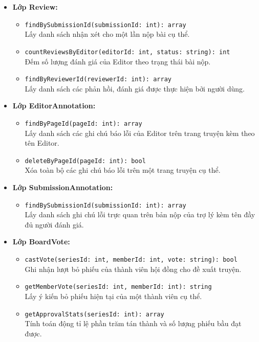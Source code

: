\begin{itemize}
    \item \textbf{Lớp Review:}
    \begin{itemize}
        \item \texttt{findBySubmissionId(submissionId: int): array}\\
            Lấy danh sách nhận xét cho một lần nộp bài cụ thể.
        \item \texttt{countReviewsByEditor(editorId: int, status: string): int}\\
            Đếm số lượng đánh giá của Editor theo trạng thái bài nộp.
        \item \texttt{findByReviewerId(reviewerId: int): array}\\
            Lấy danh sách các phản hồi, đánh giá được thực hiện bởi người dùng.
    \end{itemize}

    \item \textbf{Lớp EditorAnnotation:}
    \begin{itemize}
        \item \texttt{findByPageId(pageId: int): array}\\
            Lấy danh sách các ghi chú báo lỗi của Editor trên trang truyện kèm theo tên Editor.
        \item \texttt{deleteByPageId(pageId: int): bool}\\
            Xóa toàn bộ các ghi chú báo lỗi trên một trang truyện cụ thể.
    \end{itemize}

    \item \textbf{Lớp SubmissionAnnotation:}
    \begin{itemize}
        \item \texttt{findBySubmissionId(submissionId: int): array}\\
            Lấy danh sách ghi chú lỗi trực quan trên bản nộp của trợ lý kèm tên đầy đủ người đánh giá.
    \end{itemize}

    \item \textbf{Lớp BoardVote:}
    \begin{itemize}
        \item \texttt{castVote(seriesId: int, memberId: int, vote: string): bool}\\
            Ghi nhận lượt bỏ phiếu của thành viên hội đồng cho đề xuất truyện.
        \item \texttt{getMemberVote(seriesId: int, memberId: int): string}\\
            Lấy ý kiến bỏ phiếu hiện tại của một thành viên cụ thể.
        \item \texttt{getApprovalStats(seriesId: int): array}\\
            Tính toán động tỉ lệ phần trăm tán thành và số lượng phiếu bầu đạt được.
    \end{itemize}


\end{itemize}
